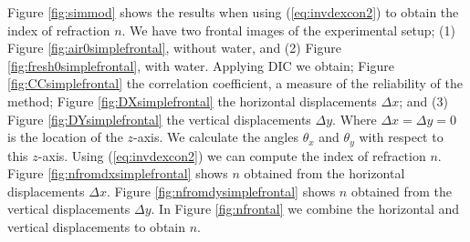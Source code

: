\documentclass[draft]{svjour3}                     %
\begin{document}
Figure \ref{fig:simmod} shows the results when using (\ref{eq:invdexcon2}) to obtain the index of refraction $n$. We have two frontal images of the experimental setup; (1) Figure \ref{fig:air0simplefrontal}, without water, and (2) Figure \ref{fig:fresh0simplefrontal}, with water.  Applying DIC we obtain; Figure \ref{fig:CCsimplefrontal} the correlation coefficient, a measure of the reliability of the method; Figure \ref{fig:DXsimplefrontal} the horizontal displacements $\Delta x$; and (3) Figure \ref{fig:DYsimplefrontal} the vertical displacements $\Delta y$. Where $\Delta x = \Delta y = 0$ is the location of the $z$-axis. We calculate the angles $\theta_x$ and $\theta_y$ with respect to this $z$-axis. Using (\ref{eq:invdexcon2}) we can compute the index of refraction $n$. Figure \ref{fig:nfromdxsimplefrontal} shows $n$ obtained from the horizontal displacements $\Delta x$.  Figure \ref{fig:nfromdysimplefrontal} shows $n$ obtained from the vertical displacements $\Delta y$. In Figure \ref{fig:nfrontal} we combine the horizontal and vertical displacements to obtain $n$.
\end{document}
